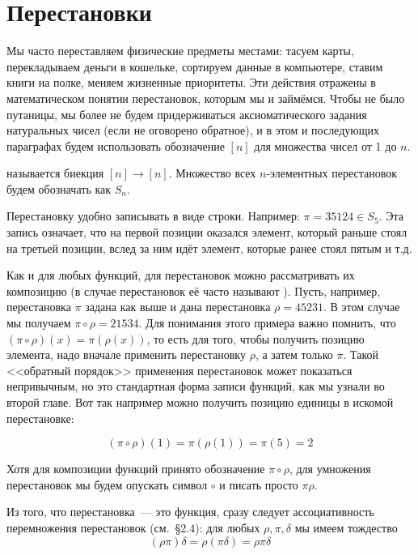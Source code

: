 \section{Перестановки}

Мы часто переставляем физические предметы местами: тасуем карты, перекладываем деньги в кошельке, сортируем данные в компьютере, ставим книги на полке, меняем жизненные приоритеты. Эти действия отражены в математическом понятии перестановок, которым мы и займёмся. Чтобы не было путаницы, мы более не будем придерживаться аксиоматического задания натуральных чисел (если не оговорено обратное), и в этом и последующих параграфах будем использовать обозначение $[n]$ для множества чисел от 1 до $n$.

\begin{definition}
 называется биекция $[n]\to[n]$. Множество всех $n$-элементных перестановок будем обозначать как $S_n$.
\end{definition}

Перестановку удобно записывать в виде строки. Например: $\pi = 35124 \in S_5$. Эта запись означает, что на первой позиции оказался элемент, который раньше стоял на третьей позиции, вслед за ним идёт элемент, которые ранее стоял пятым и т.д.

Как и для любых функций, для перестановок можно рассматривать их композицию (в случае перестановок её часто называют ). Пусть, например, перестановка $\pi$ задана как выше и дана перестановка $\rho = 45231$. В этом случае мы получаем $\pi \circ \rho = 21534$. Для понимания этого примера важно помнить, что $(\pi\circ\rho)(x) = \pi(\rho(x))$, то есть для того, чтобы получить позицию элемента, надо вначале применить перестановку $\rho$, а затем только $\pi$. Такой <<обратный порядок>> применения перестановок может показаться непривычным, но это стандартная форма записи функций, как мы узнали во второй главе. Вот так например можно получить позицию единицы в искомой перестановке:

$$(\pi\circ\rho) (1) = \pi(\rho(1)) = \pi(5) = 2$$

Хотя для композиции функций принято обозначение $\pi\circ\rho$, для умножения перестановок мы будем опускать символ $\circ$ и писать просто $\pi\rho$.

Из того, что перестановка~--- это функция, сразу следует ассоциативность перемножения перестановок (см.~\S2.4): для любых $\rho, \pi, \delta$ мы имеем тождество
$$(\rho\pi)\delta = \rho(\pi\delta) = \rho\pi\delta$$

